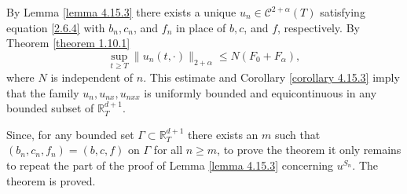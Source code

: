 \documentclass[reqno,12pt]{amsart}
\theoremstyle{definition}
\theoremstyle{remark}
\begin{document}
By Lemma \ref{lemma 4.15.3} there exists  a unique
$u_{n}\in{\mathcal{C}}^{2+\alpha}(T)$ satisfying equation \eqref{2.6.4} with
$b_{n},c_{n}$, and $f_{n}$ in place of $b,c$, and $f$,
respectively. By Theorem \ref{theorem 1.10.1}
\begin{equation}
                                            \label{2.7.6}
   \sup_{t\ge  T}\|u_{n}(t,\cdot)\|_{2+\alpha} \leq N (F_0
+ F_{\alpha}),
\end{equation}
where $N$ is independent of $n$. 
This estimate  and Corollary \ref{corollary 4.15.3} 
imply that the family
$u_{n},u_{nx},u_{nxx}$ is uniformly bounded and equicontinuous in any
bounded subset of ${\mathbb{R}}^{d+1}_{T}$.

Since, for any bounded set $\Gamma\subset  {\mathbb{R}}^{d+1}_{T}$ there
exists an $m$ such that $(b_{n},c_{n},f_{n})=(b,c,f)$ on $\Gamma$
for all $n\geq m$, to prove the theorem it only remains to repeat
the part of the proof of Lemma \ref{lemma 4.15.3} concerning
$u^{S_{n}}$. The theorem is proved.
\end{document}
